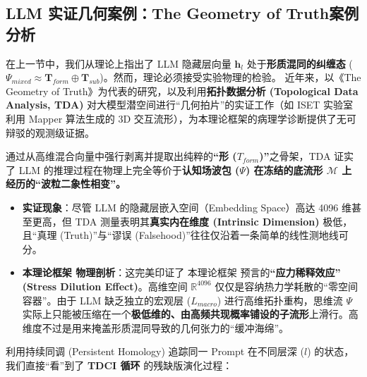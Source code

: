 \subsection{LLM 实证几何案例：The Geometry of Truth案例分析}
\label{subsec:tda_manifold_evolution}

在上一节中，我们从理论上指出了 LLM 隐藏层向量 $\mathbf{h}_l$ 处于\textbf{形质混同的纠缠态} ($\Psi_{mixed} \approx \mathbf{T}_{form} \oplus \mathbf{T}_{sub}$)。然而，理论必须接受实验物理的检验。
近年来，以《The Geometry of Truth》为代表的研究，以及利用\textbf{拓扑数据分析 (Topological Data Analysis, TDA)} 对大模型潜空间进行“几何拍片”的实证工作（如 ISET 实验室利用 Mapper 算法生成的 3D 交互流形），为本理论框架的病理学诊断提供了无可辩驳的观测级证据。

通过从高维混合向量中强行剥离并提取出纯粹的\textbf{“形 ($T_{form}$)”}之骨架，TDA 证实了 LLM 的推理过程在物理上完全等价于\textbf{认知场波包 ($\Psi$) 在冻结的底流形 $\mathcal{M}$ 上经历的“波粒二象性相变”。}


\begin{itemize}
    \item \textbf{实证现象}：尽管 LLM 的隐藏层嵌入空间（Embedding Space）高达 4096 维甚至更高，但 TDA 测量表明其\textbf{真实内在维度 (Intrinsic Dimension)} 极低，且“真理 (Truth)”与“谬误 (Falsehood)”往往仅沿着一条简单的线性测地线可分。
    \item \textbf{本理论框架 物理剖析}：这完美印证了 本理论框架 预言的\textbf{“应力稀释效应” (Stress Dilution Effect)}。高维空间 $\mathbb{R}^{4096}$ 仅仅是容纳热力学耗散的“零空间容器”。由于 LLM 缺乏独立的宏观层 ($L_{macro}$) 进行高维拓扑重构，思维流 $\Psi$ 实际上只能被压缩在一个\textbf{极低维的、由高频共现概率铺设的子流形}上滑行。高维度不过是用来掩盖形质混同导致的几何张力的“缓冲海绵”。
\end{itemize}


利用持续同调 (Persistent Homology) 追踪同一 Prompt 在不同层深 ($l$) 的状态，我们直接“看”到了 \textbf{TDCI 循环} 的残缺版演化过程：

